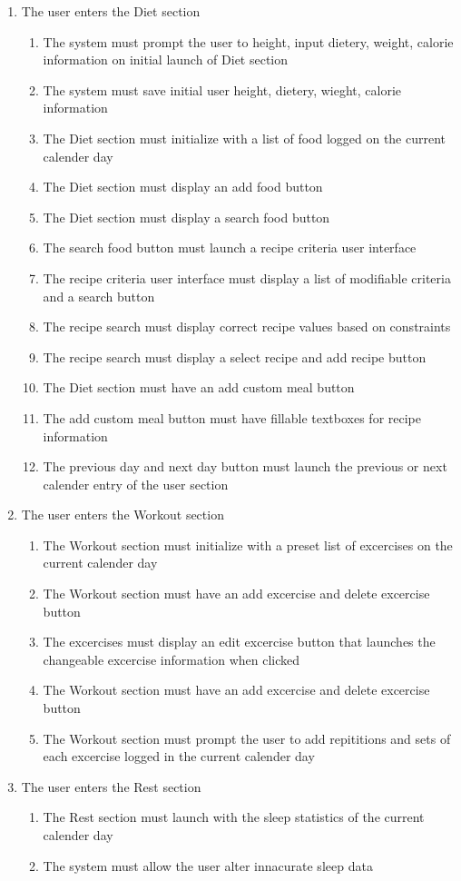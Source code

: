 \documentclass[12pt,letterpaper]{article}
\begin{document}
\begin{enumerate}[{BE}1.]
\item The user enters the Diet section
\begin{enumerate}[resume*]
	\item  The system must prompt the user to height, input dietery, weight,  calorie information on initial launch of Diet section
	\item  The system must save initial user height, dietery, wieght, calorie information
	\item  The Diet section must initialize with a list of food logged on the current calender day
	\item  The Diet section must display an add food button
	\item  The Diet section must display a search food button
	\item  The search food button must launch a recipe criteria user interface
	\item  The recipe criteria user interface must display a list of modifiable criteria and a search button
	\item  The recipe search must display correct recipe values based on constraints
	\item  The recipe search must display a select recipe and add recipe button
	\item  The Diet section must have an add custom meal button
	\item  The add custom meal button must have fillable textboxes for recipe information
	\item  The previous day and next day button must launch the previous or next calender entry of the user section
\end{enumerate}

\item The user enters the Workout section
\begin{enumerate}[resume*]
	\item  The Workout section must initialize with a preset list of excercises on the current calender day
	\item  The Workout section must have an add excercise and delete excercise button
	\item  The excercises must display an edit excercise button that launches the changeable excercise information when clicked
	\item  The Workout section must have an add excercise and delete excercise button
	\item  The Workout section must prompt the user to add repititions and sets of each excercise logged in the current calender day
\end{enumerate}

\item The user enters the Rest section
\begin{enumerate}[resume*]
	\item  The Rest section must launch with the sleep statistics of the current calender day
	\item  The system must allow the user alter innacurate sleep data
\end{enumerate}
\end{enumerate}
\end{document}
